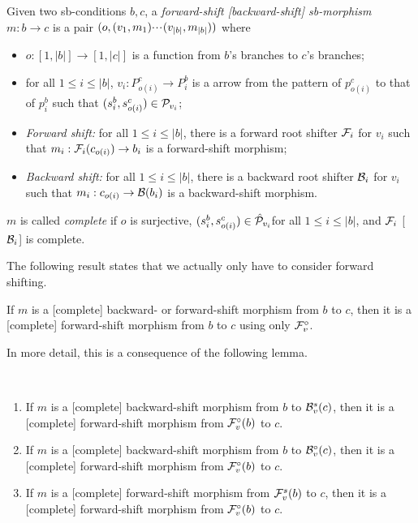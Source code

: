 \begin{definition}
  Given two sb-conditions $b,c$, a \emph{forward-shift [backward-shift] sb-morphism} $m:b\to c$ is a pair $(o,(v_1,m_1){\cdotp\mkern-2mu\cdotp\mkern-2mu\cdotp\mkern1mu} (v_{|b|},m_{|b|}))$ where
  \begin{itemize}
  \item $o:[1,|b|]\to [1,|c|]$ is a function from $b$'s branches to $c$'s branches;
  \item for all $1\leq i\leq |b|$, $v_i:P^c_{o(i)}\to P^b_i$ is a arrow from the pattern of $p^c_{o(i)}$ to that of $p^b_i$ such that $(s^b_i,s^c_{o(i)})\in \mathcal{P}_{v_i}$;
  \item \emph{Forward shift:} for all $1\leq i\leq |b|$, there is a forward root shifter $\mathcal{F}_i$ for $v_i$ such that $m_i:\mathcal{F}_i(c_{o(i)})\to b_i$ is a forward-shift morphism;
  \item \emph{Backward shift:} for all $1\leq i\leq |b|$, there is a backward root shifter $\mathcal{B}_i$ for $v_i$ such that $m_i:c_{o(i)}\to \mathcal{B}(b_i)$ is a backward-shift morphism.
  \end{itemize}
  $m$ is called \emph{complete} if $o$ is surjective, $(s^b_i,s^c_{o(i)})\in \hat{\mathcal{P}}_{v_i}$for all $1\leq i\leq |b|$, and $\mathcal{F}_i$ [$\mathcal{B}_i$] is complete.
\end{definition}
%
The following result states that we actually only have to consider forward shifting.
%
\begin{proposition}
If $m$ is a [complete] backward- or forward-shift morphism from $b$ to $c$, then it is a [complete] forward-shift morphism from $b$ to $c$ using only $\mathcal{F}_v^\circ$.
\end{proposition}
%
In more detail, this is a consequence of the following lemma.
%
\begin{lemma}~
\begin{enumerate}
\item If $m$ is a [complete] backward-shift morphism from $b$ to $\mathcal{B}_v^s(c)$, then it is a [complete] forward-shift morphism from $\mathcal{F}_v^\circ(b)$ to $c$.
\item If $m$ is a [complete] backward-shift morphism from $b$ to $\mathcal{B}_v^\circ(c)$, then it is a [complete] forward-shift morphism from $\mathcal{F}_v^\circ(b)$ to $c$.
\item If $m$ is a [complete] forward-shift morphism from $\mathcal{F}_v^s(b)$ to $c$, then it is a [complete] forward-shift morphism from $\mathcal{F}_v^\circ(b)$ to $c$.
\end{enumerate}
\end{lemma}

